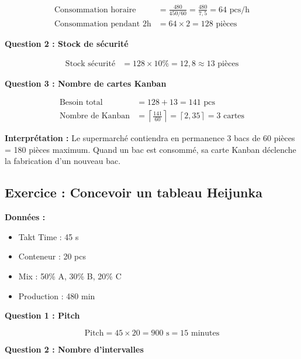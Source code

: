 \documentclass[12pt,a4paper]{article}
\begin{document}
\begin{align*}
    \text{Consommation horaire} &= \frac{480}{450/60} = \frac{480}{7{,}5} = 64 \text{ pcs/h} \\[0.3cm]
    \text{Consommation pendant 2h} &= 64 \times 2 = \boxed{128 \text{ pièces}}
\end{align*}

\textbf{Question 2 : Stock de sécurité}

\begin{align*}
    \text{Stock sécurité} &= 128 \times 10\% = \boxed{12{,}8 \approx 13 \text{ pièces}}
\end{align*}

\textbf{Question 3 : Nombre de cartes Kanban}

\begin{align*}
    \text{Besoin total} &= 128 + 13 = 141 \text{ pcs} \\[0.3cm]
    \text{Nombre de Kanban} &= \left\lceil \frac{141}{60} \right\rceil = \left\lceil 2{,}35 \right\rceil = \boxed{3 \text{ cartes}}
\end{align*}

\begin{tcolorbox}[pedagogique]
\textbf{Interprétation :} Le supermarché contiendra en permanence 3 bacs de 60 pièces = 180 pièces maximum. Quand un bac est consommé, sa carte Kanban déclenche la fabrication d'un nouveau bac.
\end{tcolorbox}

\subsection{Exercice : Concevoir un tableau Heijunka}

\textbf{Données :}
\begin{itemize}
    \item Takt Time : 45 s
    \item Conteneur : 20 pcs
    \item Mix : 50\% A, 30\% B, 20\% C
    \item Production : 480 min
\end{itemize}

\textbf{Question 1 : Pitch}

\begin{equation*}
    \text{Pitch} = 45 \times 20 = 900 \text{ s} = \boxed{15 \text{ minutes}}
\end{equation*}

\textbf{Question 2 : Nombre d'intervalles}
\end{document}
